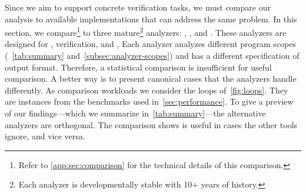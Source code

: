 Since we aim to support concrete verification tasks, we must compare our
analysis to available implementations that can address the same problem. In this
section, we compare\footnote{Refer to \autoref{app:sec:comparison} for the
technical details of this comparison.} \ndx{\impl} to three mature\footnote{Each
analyzer is developmentally stable with 10+ years of history.} analyzers:
, , and . These analyzers are designed for
, verification, and , \resp
Each analyzer analyzes different program scopes (\cf~\autoref{tab:summary}
and~\autoref{subsec:analyzer-scopes}) and has a different specification of
output format. Therefore, a statistical comparison is insufficient for useful
comparison. A better way is to present canonical cases that the analyzers handle
differently. As comparison workloads we consider the loops
of~\autoref{fig:loops}. They are instances from the benchmarks used
in~\autoref{sec:performance}. To give a preview of our findings---which we
summarize in~\autoref{tab:summary}---the alternative analyzers are {orthogonal}.
The comparison shows \ndx{\impl} is useful in cases the other tools ignore, and
vice versa.

